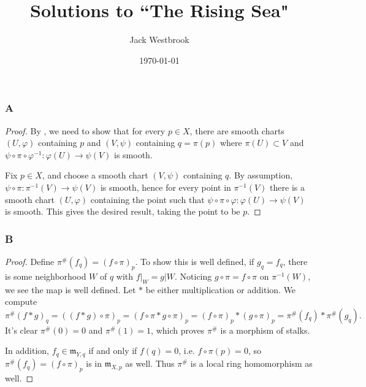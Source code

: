 \documentclass{article}
\title{Solutions to ``The Rising Sea"}
\author{Jack Westbrook}
\date\today
\newcommand{\frkm}{\mathfrak{m}}
\theoremstyle{definition} %
\begin{document}
\maketitle %

\section{}
\subsection{}
\subsubsection{A}\label{3.1.A}
\begin{proof}
    By \cite{Lee_Manifolds}, we need to show that for every $p\in X$, there are smooth charts $(U,\varphi)$ containing $p$ and $(V,\psi)$ containing $q=\pi(p)$ where $\pi(U)\subset V$ and $\psi\circ \pi \circ \varphi^{-1}:\varphi(U)\to \psi(V)$ is smooth.

    Fix $p\in X$, and choose a smooth chart $(V,\psi)$ containing $q$. By assumption, $\psi \circ \pi:\pi^{-1}(V)\to \psi(V)$ is smooth, hence for every point in $\pi^{-1}(V)$ there is a smooth chart $(U,\varphi)$ containing the point such that $\psi \circ \pi \circ \varphi:\varphi(U) \to \psi(V)$ is smooth. This gives the desired result, taking the point to be $p$.
\end{proof}
\subsubsection{B}\label{3.1.B}
\begin{proof}
    Define $\pi^\#(f_q)=(f\circ \pi)_p$. To show this is well defined, if $g_q=f_q$, there is some neighborhood $W$ of $q$ with $f\vert_W = g\vert W$. Noticing $g\circ \pi = f\circ \pi$ on $\pi^{-1}(W)$, we see the map is well defined. Let $*$ be either multiplication or addition. We compute
    \[
    \pi^\#(f*g)_q = ((f*g)\circ \pi)_p = (f\circ \pi * g\circ \pi)_p=(f\circ \pi)_p * (g\circ \pi)_p=\pi^\#(f_q)*\pi^\#(g_q).
    \]
    It's clear $\pi^\#(0)=0$ and $\pi^\#(1)=1$, which proves $\pi^\#$ is a morphism of stalks.

    In addition, $f_q\in \frkm_{Y,q}$ if and only if $f(q)=0$, i.e. $f\circ \pi(p)=0$, so $\pi^\#(f_q)=(f\circ \pi)_p$ is in $\frkm_{X,p}$ as well. Thus $\pi^\#$ is a local ring homomorphism as well.
\end{proof}
\end{document}
